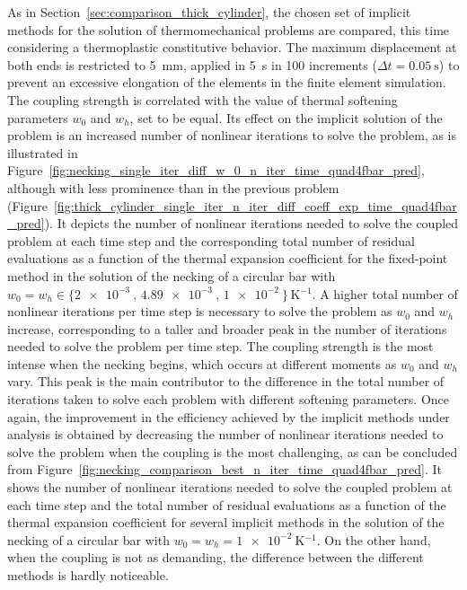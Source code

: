      As in Section~\ref{sec:comparison_thick_cylinder}, the chosen set of implicit methods for the solution of thermomechanical problems are compared, this time considering a thermoplastic constitutive behavior.
     The maximum displacement at both ends is restricted to \SI{5}{\milli\meter}, applied in \SI{5}{\second} in 100 increments (\(\Delta t = \SI{0.05}{\second}\)) to prevent an excessive elongation of the elements in the finite element simulation.
     The coupling strength is correlated with the value of thermal softening parameters \(w_0\) and \(w_h\), set to be equal.
     Its effect on the implicit solution of the problem is an increased number of nonlinear iterations to solve the problem, as is illustrated in Figure~\ref{fig:necking_single_iter_diff_w_0_n_iter_time_quad4fbar_pred}, although with less prominence than in the previous problem (Figure~\ref{fig:thick_cylinder_single_iter_n_iter_diff_coeff_exp_time_quad4fbar_pred}).
     It depicts the number of nonlinear iterations needed to solve the coupled problem at each time step and the corresponding total number of residual evaluations as a function of the thermal expansion coefficient for the fixed-point method in the solution of the necking of a circular bar with \(w_0=w_h\in\{\SI{2e-3}{},\, \SI{4.89e-3}{},\, \SI{1e-2}{}\}\,\si{\kelvin^{-1}}\).
     A higher total number of nonlinear iterations per time step is necessary to solve the problem as \(w_0\) and \(w_h\) increase, corresponding to a taller and broader peak in the number of iterations needed to solve the problem per time step.
     The coupling strength is the most intense when the necking begins, which occurs at different moments as \(w_0\) and \(w_h\) vary.
     This peak is the main contributor to the difference in the total number of iterations taken to solve each problem with different softening parameters.
     Once again, the improvement in the efficiency achieved by the implicit methods under analysis is obtained by decreasing the number of nonlinear iterations needed to solve the problem when the coupling is the most challenging, as can be concluded from Figure~\ref{fig:necking_comparison_best_n_iter_time_quad4fbar_pred}.
     It shows the number of nonlinear iterations needed to solve the coupled problem at each time step and the total number of residual evaluations as a function of the thermal expansion coefficient for several implicit methods in the solution of the necking of a circular bar with \(w_0=w_h=\SI{1e-2}{\kelvin^{-1}}\).
     On the other hand, when the coupling is not as demanding, the difference between the different methods is hardly noticeable.

